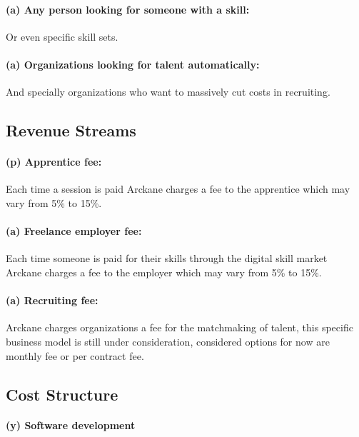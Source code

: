 \paragraph{(a) Any person looking for someone with a skill:} Or even specific skill sets.

\paragraph{(a) Organizations looking for talent automatically:} And specially organizations who want to massively cut costs in recruiting.


\subsection{Revenue Streams}

\paragraph{(p) Apprentice fee:} Each time a session is paid Arckane charges a fee to the apprentice which may vary from 5\% to 15\%.

\paragraph{(a) Freelance employer fee:} Each time someone is paid for their skills through the digital skill market Arckane charges a fee to the employer which may vary from 5\% to 15\%.

\paragraph{(a) Recruiting fee:} Arckane charges organizations a fee for the matchmaking of talent, this specific business model is still under consideration, considered options for now are monthly fee or per contract fee.


\subsection{Cost Structure}

\paragraph{(y) Software development}

